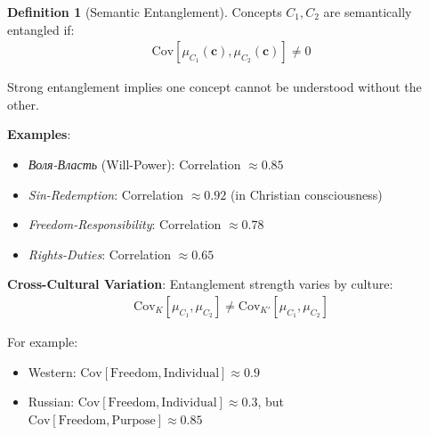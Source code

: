\documentclass[11pt,a4paper]{article}
\theoremstyle{definition}
\newtheorem{definition}{Definition}[section]
\theoremstyle{remark}
\newcommand{\cc}{\mathbf{c}}
\begin{document}
\begin{definition}[Semantic Entanglement]
Concepts \(C_1, C_2\) are semantically entangled if:
\begin{align}
\text{Cov}[\mu_{C_1}(\cc), \mu_{C_2}(\cc)] \neq 0
\end{align}

Strong entanglement implies one concept cannot be understood without the other.

\textbf{Examples}:
\begin{itemize}
    \item \textit{Воля-Власть} (Will-Power): Correlation \(\approx 0.85\)
    \item \textit{Sin-Redemption}: Correlation \(\approx 0.92\) (in Christian consciousness)
    \item \textit{Freedom-Responsibility}: Correlation \(\approx 0.78\)
    \item \textit{Rights-Duties}: Correlation \(\approx 0.65\)
\end{itemize}

\textbf{Cross-Cultural Variation}: Entanglement strength varies by culture:
\begin{align}
\text{Cov}_K[\mu_{C_1}, \mu_{C_2}] \neq \text{Cov}_{K'}[\mu_{C_1}, \mu_{C_2}]
\end{align}

For example:
\begin{itemize}
    \item Western: \(\text{Cov}[\text{Freedom}, \text{Individual}] \approx 0.9\)
    \item Russian: \(\text{Cov}[\text{Freedom}, \text{Individual}] \approx 0.3\), but \(\text{Cov}[\text{Freedom}, \text{Purpose}] \approx 0.85\)
\end{itemize}
\end{definition}
\end{document}
